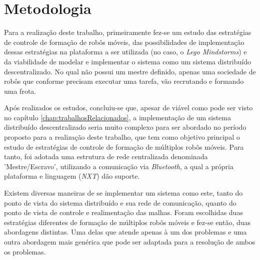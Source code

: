 %
%
\chapter{Metodologia}
\label{chap:Metod}
Para a realização deste trabalho, primeiramente fez-se um estudo das estratégias de controle de formação de robôs móveis, das possibilidades %
de implementação dessas estratégias na plataforma a ser utilizada (no caso, o \emph{Lego Mindstorms\textregistered}) e da viabilidade de modelar e implementar o sistema como um sistema distribuído descentralizado. No qual não possui um mestre definido, apenas uma sociedade de robôs que conforme precisam executar uma tarefa, vão recrutando e formando uma frota. 

Após realizados os estudos, concluiu-se que, apesar de viável como pode ser visto no capítulo \ref{chap:trabalhosRelacionados}, a implementação de um sistema distribuído descentralizado seria muito complexo para ser abordado no período proposto para a realização deste trabalho, que tem como objetivo principal o estudo de estratégias de controle de formação de múltiplos robôs móveis. Para tanto, foi adotada uma estrutura de rede centralizada denominada 'Mestre/Escravo', utilizando a comunicação via \emph{Bluetooth}, a qual a própria plataforma e linguagem (\emph{NXT}) dão suporte. 


Existem diversas maneiras de se implementar um sistema como este, tanto do ponto de vista do sistema distribuído e sua rede de comunicação, quanto do ponto de vista de controle e realimentação das malhas. Foram escolhidas duas estratégias diferentes de formação de múltiplos robôs móveis e fez-se então, duas abordagens distintas. Uma delas que atende apenas à um dos problemas e uma outra abordagem mais genérica que pode ser adaptada para a resolução de ambos os problemas. 

